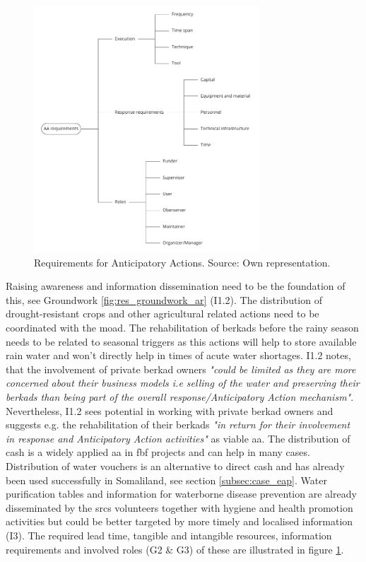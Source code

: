 \begin{figure}[!hb]
    \centering
    \includegraphics[width=0.75\textwidth]{figures/2023_MA_results_AA.pdf}
    \decoRule
    \caption[Requirements for Anticipatory Actions]{Requirements for Anticipatory Actions. Source: Own representation.}
    \label{fig:res_aa}
\end{figure}

Raising awareness and information dissemination need to be the foundation of this, see Groundwork \ref{fig:res_groundwork_ar} (I1.2). The distribution of drought-resistant crops and other agricultural related actions need to be coordinated with the \acrfull{moad}. The rehabilitation of berkads before the rainy season needs to be related to seasonal triggers as this actions will help to store available rain water and won't directly help in times of acute water shortages. I1.2 notes, that the involvement of private berkad owners \textit{"could be limited as they are more concerned about their business models i.e selling of the water and preserving their berkads than being part of the overall response/Anticipatory Action mechanism"}. Nevertheless, I1.2 sees potential in working with private berkad owners and suggests e.g. the rehabilitation of their berkads \textit{"in return for their involvement in response and Anticipatory Action activities"} as viable \acrshort{aa}. The distribution of cash is a widely applied \acrshort{aa} in \acrshort{fbf} projects and can help in many cases. Distribution of water vouchers is an alternative to direct cash and has already been used successfully in Somaliland, see section \ref{subsec:case_eap}. Water purification tables and information for waterborne disease prevention are already disseminated by the \acrshort{srcs} volunteers together with hygiene and health promotion activities but could be better targeted by more timely and localised information (I3). The required lead time, tangible and intangible resources, information requirements and involved roles (G2 \& G3) of these  are illustrated in figure \ref{fig:res_aa}.


